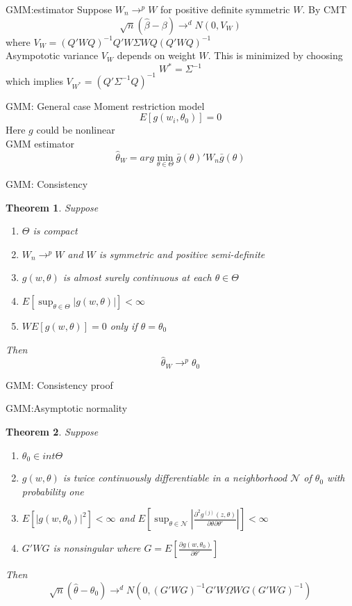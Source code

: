 \documentclass{beamer}
\newtheorem{thm}{Theorem}[subsection]
\begin{document}
\begin{frame}{GMM:estimator}
	Suppose $W_n \rightarrow^p W$ for positive definite symmetric $W$. By CMT
	\[\sqrt{n} (\hat{\beta} - \beta) \rightarrow^d N(0,V_W)\]
	where $V_W = (Q'WQ)^{-1} Q'W\Sigma WQ(Q'WQ)^{-1}$ \\
	Asympototic variance $V_W$ depends on weight $W$. This is minimized by choosing
	\[W^* = \Sigma^{-1}\]
	which implies $V_{W^*} = (Q'\Sigma^{-1}Q)^{-1}$ 
\end{frame}
\begin{frame}{GMM: General case}
	Moment restriction model
	\[E[g(w_i,\theta_0)] = 0\]
	Here $g$ could be nonlinear \\
	GMM estimator
	\[\hat{\theta}_W = arg \min_{\theta \in \Theta} \bar{g}(\theta)' W_n \bar{g}(\theta)\]
\end{frame}
\begin{frame}{GMM: Consistency}
	\begin{thm}
		Suppose
		\begin{enumerate}
		\item $\Theta$ is compact
		\item $W_n \rightarrow^p W$ and $W$ is symmetric and positive semi-definite
		\item $g(w,\theta)$ is almost surely continuous at each $\theta \in \Theta$
		\item $E[\sup_{\theta \in \Theta} |g(w,\theta)|] < \infty$
		\item $WE[g(w,\theta)] = 0$ only if $\theta = \theta_0$
		\end{enumerate}
		Then
		\[\hat{\theta}_W \rightarrow^p \theta_0\]
	\end{thm}
\end{frame}
\begin{frame}{GMM: Consistency proof}
\end{frame}
\begin{frame}{GMM:Asymptotic normality}
	\begin{thm}
		Suppose 
		\begin{enumerate}
				\item $\theta_0 \in int \Theta$
				\item $g(w, \theta)$ is twice continuously differentiable in a neighborhood $\mathcal{N}$ of $\theta_0$ with probability one
				\item $E[|g(w,\theta_0)|^2] < \infty$ and $E[\sup_{\theta \in \mathcal{N}} | \frac{\partial^2 g^{(j)}(z,\theta)}{\partial \theta \partial \theta'}|] < \infty$
				\item $G'WG$ is nonsingular where $G = E[\frac{\partial g(w,\theta_0)}{\partial \theta'}]$
		\end{enumerate}
		Then
		\[\sqrt{n}(\hat{\theta} - \theta_0) \rightarrow^d N(0,(G'WG)^{-1} G'W\Omega WG(G'WG)^{-1})\]
	\end{thm}
\end{frame}
\end{document}
